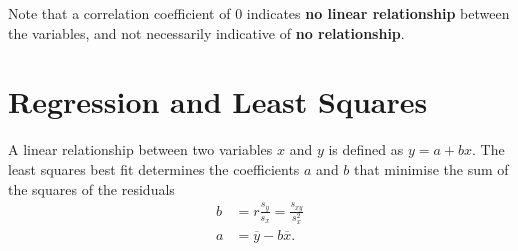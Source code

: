\documentclass{article}
\begin{document}
\begin{multicols}{3}
Note that a correlation coefficient of \(0\)
indicates \textbf{no linear relationship} between the variables, and not necessarily indicative of \textbf{no relationship}.
\section{Regression and Least Squares}
A linear relationship between two variables \(x\) and \(y\) is defined as
\(
    y = a + b x.
    \)
The least squares best fit determines the coefficients \(a\) and \(b\) that minimise the sum of the squares of the residuals
\begin{align*}
    b & = r \frac{s_y}{s_x} = \frac{s_{xy}}{s_x^2} \\
    a & = \overline{y} - b \overline{x}.
\end{align*}



\end{multicols}
\end{document}
